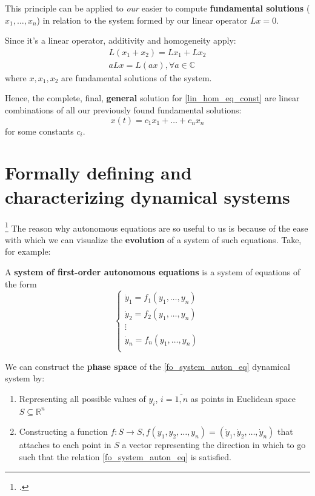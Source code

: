 This principle can be applied to \textit{our} easier to compute \textbf{fundamental solutions} ($x_1,\dots,x_n$) in relation to the system formed by our linear operator $Lx =0$.

Since it's a linear operator, additivity and homogeneity apply:
\begin{gather*}
	L(x_1+x_2) = Lx_1 + Lx_2\\
	aLx = L(ax) , \forall a \in \mathbb{C}
\end{gather*}
where $x,x_1,x_2$ are fundamental solutions of the system.

Hence, the complete, final, \textbf{general} solution for \ref{lin_hom_eq_const} are linear combinations of all our previously found fundamental solutions:
\[
	x(t) = c_1 x_1 + \dots + c_nx_n
\]
for some constants $c_i$.
\newpage
\section{Formally defining and characterizing dynamical systems}\label{ch:dynamical_systems}
\footcite{Hiroki2015}
The reason why autonomous equations are so useful to us is because of the ease with which we can visualize the \textbf{evolution} of a system of such equations.
Take, for example:
\begin{definition}
	A \textbf{system of first-order autonomous equations} is a system of equations of the form
	\begin{equation}\label{fo_system_auton_eq}
		\begin{cases}
			\dot{y}_1 = f_1(y_1,\dots, y_n) \\
			\dot{y}_2 = f_2(y_1,\dots, y_n) \\
			\vdots                          \\
			\dot{y}_n = f_n(y_1,\dots, y_n) \\
		\end{cases}
	\end{equation}
\end{definition}

\begin{definition}
	We can construct the \textbf{phase space} of the \ref{fo_system_auton_eq} dynamical system by:

	\begin{enumerate}
		\item Representing all possible values of $y_i$, $ i = \overline{1,n}$ as points in Euclidean space $S \subseteq \mathbb{R}^n$

		\item Constructing a function $f : S \rightarrow S, f(y_1,y_2,\dots,y_n) = (\dot{y}_1,\dot{y}_2,\dots,\dot{y}_n)$ that attaches to each point in $S$ a vector representing the direction in which to go such that the relation \ref{fo_system_auton_eq} is satisfied.
	\end{enumerate}
\end{definition}

